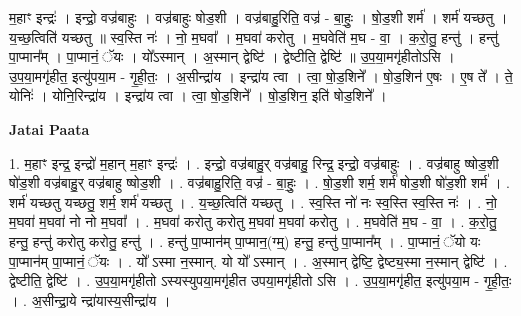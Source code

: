 \documentclass[17pt]{extarticle}
\begin{document}
म॒हाꣳ इन्द्रः॑ । इन्द्रो॒ वज्र॑बाहुः । वज्र॑बाहुः षोड॒शी । वज्र॑बाहु॒रिति॒ वज्र॑ - बा॒हुः॒ । षो॒ड॒शी शर्म॑ । शर्म॑ यच्छतु । य॒च्छ॒त्विति॑ यच्छतु ॥ स्व॒स्ति नः॑ । नो॒ म॒घवा᳚ । म॒घवा॑ करोतु । म॒घवेति॑ म॒घ - वा॒ । क॒रो॒तु॒ हन्तु॑ । हन्तु॑ पा॒प्मान᳚म् । पा॒प्मानं॒ ॅयः । यो᳚ऽस्मान् । अ॒स्मान् द्वेष्टि॑ । द्वेष्टीति॒ द्वेष्टि॑ ॥ उ॒प॒या॒मगृ॑हीतोऽसि । उ॒प॒या॒मगृ॑हीत॒ इत्यु॑पया॒म - गृ॒ही॒तः॒ । अ॒सीन्द्रा॑य । इन्द्रा॑य त्वा । त्वा॒ षो॒ड॒शिने᳚ । षो॒ड॒शिन॑ ए॒षः । ए॒ष ते᳚ । ते॒ योनिः॑ । योनि॒रिन्द्रा॑य । इन्द्रा॑य त्वा । त्वा॒ षो॒ड॒शिने᳚ । षो॒ड॒शिन॒ इति॑ षोड॒शिने᳚ । \newline

\textbf{Jatai Paata} \newline

1. म॒हाꣳ इन्द्र॒ इन्द्रो॑ म॒हान् म॒हाꣳ इन्द्रः॑ । . इन्द्रो॒ वज्र॑बाहु॒र् वज्र॑बाहु॒ रिन्द्र॒ इन्द्रो॒ वज्र॑बाहुः । . वज्र॑बाहु ष्षोड॒शी षो॑ड॒शी वज्र॑बाहु॒र् वज्र॑बाहु ष्षोड॒शी । . वज्र॑बाहु॒रिति॒ वज्र॑ - बा॒हुः॒ । . षो॒ड॒शी शर्म॒ शर्म॑ षोड॒शी षो॑ड॒शी शर्म॑ । . शर्म॑ यच्छतु यच्छतु॒ शर्म॒ शर्म॑ यच्छतु । . य॒च्छ॒त्विति॑ यच्छतु । . स्व॒स्ति नो॑ नः स्व॒स्ति स्व॒स्ति नः॑ । . नो॒ म॒घवा॑ म॒घवा॑ नो नो म॒घवा᳚ । . म॒घवा॑ करोतु करोतु म॒घवा॑ म॒घवा॑ करोतु । . म॒घवेति॑ म॒घ - वा॒ । . क॒रो॒तु॒ हन्तु॒ हन्तु॑ करोतु करोतु॒ हन्तु॑ । . हन्तु॑ पा॒प्मान॑म् पा॒प्मान॒(ग्म्॒) हन्तु॒ हन्तु॑ पा॒प्मान᳚म् । . पा॒प्मानं॒ ॅयो यः पा॒प्मान॑म् पा॒प्मानं॒ ॅयः । . यो᳚ ऽस्मा न॒स्मान्. यो यो᳚ ऽस्मान् । . अ॒स्मान् द्वेष्टि॒ द्वेष्ट्य॒स्मा न॒स्मान् द्वेष्टि॑ । . द्वेष्टीति॒ द्वेष्टि॑ । . उ॒प॒या॒मगृ॑हीतो ऽस्यस्युपया॒मगृ॑हीत उपया॒मगृ॑हीतो ऽसि । . उ॒प॒या॒मगृ॑हीत॒ इत्यु॑पया॒म - गृ॒ही॒तः॒ । . अ॒सीन्द्रा॒ये न्द्रा॑यास्य॒सीन्द्रा॑य । \newline
\end{document}
